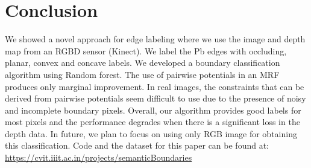 \section{Conclusion}
We showed a novel approach for edge labeling where we use the image and depth map from 
an RGBD sensor (Kinect). We label the Pb edges with occluding, planar, convex and 
concave labels. We developed a boundary classification algorithm using Random forest. 
The use of pairwise potentials in an MRF produces only marginal improvement. In real 
images, the constraints that can be derived from pairwise potentials seem 
difficult to use due to the presence of noisy and incomplete boundary pixels. Overall, 
our algorithm provides good labels for most pixels and the performance degrades 
when there is a significant loss in the depth data. In future, we plan to focus on 
using only RGB image for obtaining this classification. Code and the dataset for this 
paper can be found at: \url{https://cvit.iiit.ac.in/projects/semanticBoundaries}
